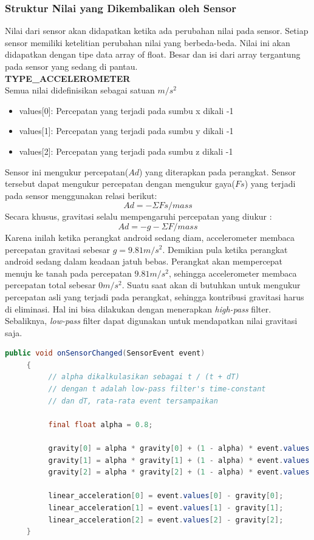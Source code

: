 \subsubsection{Struktur Nilai yang Dikembalikan oleh Sensor}
Nilai dari sensor akan didapatkan ketika ada perubahan nilai pada sensor. Setiap sensor memiliki ketelitian perubahan nilai yang berbeda-beda. Nilai ini akan didapatkan dengan tipe data array of float. Besar dan isi dari array tergantung pada sensor yang sedang di pantau.\\
\textbf{TYPE\_ACCELEROMETER}\\
Semua nilai didefinisikan sebagai satuan \(m/s^2\)
\begin{itemize}
	\item values[0]: Percepatan yang terjadi pada sumbu x dikali -1
	\item values[1]: Percepatan yang terjadi pada sumbu y dikali -1
	\item values[2]: Percepatan yang terjadi pada sumbu z dikali -1
\end{itemize}
Sensor ini mengukur percepatan(\(Ad\)) yang diterapkan pada perangkat. Sensor tersebut dapat mengukur percepatan dengan mengukur gaya(\(Fs\)) yang terjadi pada sensor menggunakan relasi berikut:
\[
	Ad = -\Sigma Fs / mass
\]
Secara khusus, gravitasi selalu mempengaruhi percepatan yang diukur :
\[
	Ad =  -g -\Sigma F / mass
\]
Karena inilah ketika perangkat android sedang diam, accelerometer membaca percepatan gravitasi sebesar \(g = 9.81m/s^2\).
Demikian pula ketika perangkat android sedang dalam keadaan jatuh bebas. Perangkat akan mempercepat menuju ke tanah pada percepatan \(9.81 m/s^2\), sehingga accelerometer membaca percepatan total sebesar \( 0 m/s^2\). 
Suatu saat akan di butuhkan untuk mengukur percepatan asli yang terjadi pada perangkat, sehingga kontribusi gravitasi harus di eliminasi. Hal ini bisa dilakukan dengan menerapkan \textit{high-pass} filter. Sebaliknya, \textit{low-pass} filter dapat digunakan untuk mendapatkan nilai gravitasi saja. 
\begin{lstlisting}[caption={Implementasi \textit{low-pass} filter},label={lst:low-pass-filter},language=java]
	 public void onSensorChanged(SensorEvent event)
     {
          // alpha dikalkulasikan sebagai t / (t + dT)
          // dengan t adalah low-pass filter's time-constant
          // dan dT, rata-rata event tersampaikan

          final float alpha = 0.8;

          gravity[0] = alpha * gravity[0] + (1 - alpha) * event.values[0];
          gravity[1] = alpha * gravity[1] + (1 - alpha) * event.values[1];
          gravity[2] = alpha * gravity[2] + (1 - alpha) * event.values[2];

          linear_acceleration[0] = event.values[0] - gravity[0];
          linear_acceleration[1] = event.values[1] - gravity[1];
          linear_acceleration[2] = event.values[2] - gravity[2];
     }
\end{lstlisting}
